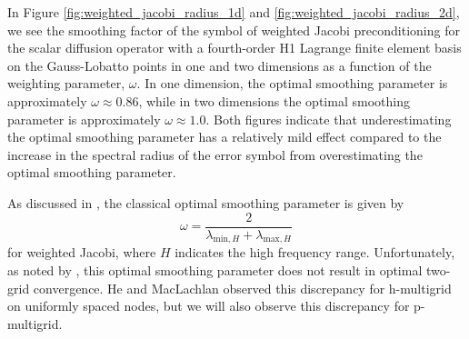 In Figure \ref{fig:weighted_jacobi_radius_1d} and \ref{fig:weighted_jacobi_radius_2d}, we see the smoothing factor of the symbol of weighted Jacobi preconditioning for the scalar diffusion operator with a fourth-order H1 Lagrange finite element basis on the Gauss-Lobatto points in one and two dimensions as a function of the weighting parameter, $\omega$.
In one dimension, the optimal smoothing parameter is approximately $\omega \approx 0.86$, while in two dimensions the optimal smoothing parameter is approximately $\omega \approx 1.0$.
Both figures indicate that underestimating the optimal smoothing parameter has a relatively mild effect compared to the increase in the spectral radius of the error symbol from overestimating the optimal smoothing parameter.

As discussed in \cite{he2020two}, the classical optimal smoothing parameter is given by
\begin{equation}
\omega = \frac{2}{\lambda_{\text{min}, H} + \lambda_{\text{max}, H}}
\end{equation}
for weighted Jacobi, where $H$ indicates the high frequency range.
Unfortunately, as noted by \cite{he2020two}, this optimal smoothing parameter does not result in optimal two-grid convergence.
He and MacLachlan observed this discrepancy for h-multigrid on uniformly spaced nodes, but we will also observe this discrepancy for p-multigrid.
